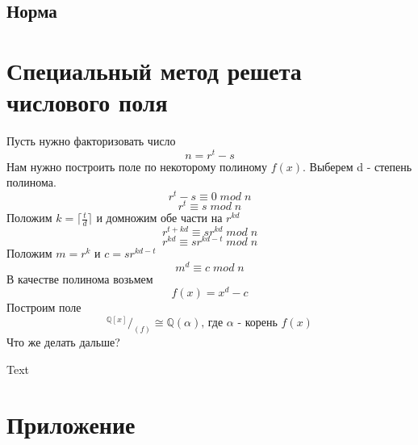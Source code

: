 \documentclass[oneside,final,14pt]{extreport}
\theoremstyle{plain}
\begin{document}
\section{Норма}

\chapter{Специальный метод решета числового поля}
Пусть нужно факторизовать число $$n=r^t-s$$
Нам нужно построить поле по некоторому полиному $f(x)$. Выберем d - степень полинома.
$$r^t-s\equiv0 \; mod \; n$$
$$r^t\equiv s \; mod \; n$$
Положим $k=\lceil\frac{t}{d}\rceil$ и домножим обе части на $r^{kd}$
$$r^{t+kd}\equiv sr^{kd} \; mod \; n$$
$$r^{kd}\equiv sr^{kd-t} \; mod \; n$$
Положим $m=r^{k}$ и $c=sr^{kd-t}$
$$m^{d}\equiv c \; mod \; n$$
В качестве полинома возьмем
$$f(x)=x^d-c$$
Построим поле
$$^{\mathbb{Q}[x]}/_{(f)} \cong \mathbb{Q}(\alpha)\text{, где $\alpha$ - корень $f(x)$}$$
Что же делать дальше?







\begin{thebibliography}{0}




 Text







\end{thebibliography}
\appendix
\chapter{Приложение}\label{AppendixA}
\end{document}
